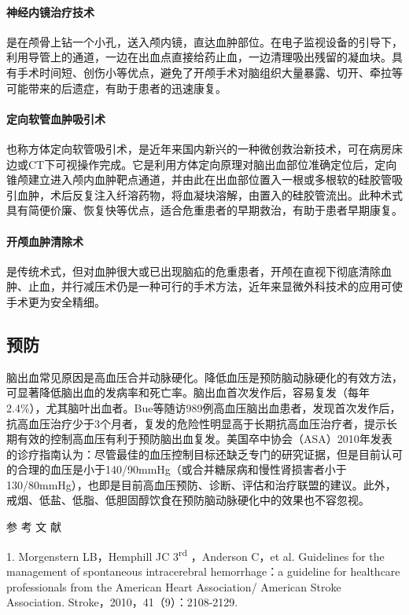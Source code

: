 \paragraph{神经内镜治疗技术}

是在颅骨上钻一个小孔，送入颅内镜，直达血肿部位。在电子监视设备的引导下，利用导管上的通道，一边在出血点直接给药止血，一边清理吸出残留的凝血块。具有手术时间短、创伤小等优点，避免了开颅手术对脑组织大量暴露、切开、牵拉等可能带来的后遗症，有助于患者的迅速康复。

\paragraph{定向软管血肿吸引术}

也称方体定向软管吸引术，是近年来国内新兴的一种微创救治新技术，可在病房床边或CT下可视操作完成。它是利用方体定向原理对脑出血部位准确定位后，定向锥颅建立进入颅内血肿靶点通道，并由此在出血部位置入一根或多根软的硅胶管吸引血肿，术后反复注入纤溶药物，将血凝块溶解，由置入的硅胶管流出。此种术式具有简便价廉、恢复快等优点，适合危重患者的早期救治，有助于患者早期康复。

\paragraph{开颅血肿清除术}

是传统术式，但对血肿很大或已出现脑疝的危重患者，开颅在直视下彻底清除血肿、止血，并行减压术仍是一种可行的手术方法，近年来显微外科技术的应用可使手术更为安全精细。

\subsection{预防}

脑出血常见原因是高血压合并动脉硬化。降低血压是预防脑动脉硬化的有效方法，可显著降低脑出血的发病率和死亡率。脑出血首次发作后，容易复发（每年2.4\%），尤其脑叶出血者。Bue等随访989例高血压脑出血患者，发现首次发作后，抗高血压治疗少于3个月者，复发的危险性明显高于长期抗高血压治疗者，提示长期有效的控制高血压有利于预防脑出血复发。美国卒中协会（ASA）2010年发表的诊疗指南认为：尽管最佳的血压控制目标还缺乏专门的研究证据，但是目前认可的合理的血压是小于140/90mmHg（或合并糖尿病和慢性肾损害者小于130/80mmHg），也即是目前高血压预防、诊断、评估和治疗联盟的建议。此外，戒烟、低盐、低脂、低胆固醇饮食在预防脑动脉硬化中的效果也不容忽视。

\hypertarget{text00243.htmlux5cux23CHP8-1-3-5}{}
参 考 文 献

1. Morgenstern LB，Hemphill JC 3\textsuperscript{rd} ，Anderson C，et
al. Guidelines for the management of spontaneous intracerebral
hemorrhage：a guideline for healthcare professionals from the American
Heart Association/ American Stroke Association.
Stroke，2010，41（9）：2108-2129.

